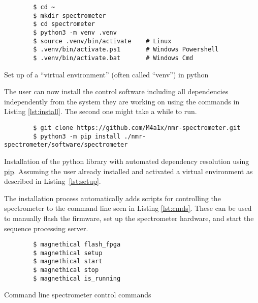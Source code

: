 \begin{listing}[h!bt]
    \begin{verbatim}
        $ cd ~
        $ mkdir spectrometer
        $ cd spectrometer
        $ python3 -m venv .venv
        $ source .venv/bin/activate    # Linux
        $ .venv/bin/activate.ps1       # Windows Powershell
        $ .venv/bin/activate.bat       # Windows Cmd
    \end{verbatim}
    \caption{Set up of a \enquote{virtual environment} (often called \enquote{venv}) in \gls{python}}
    \label{lst:setup}
\end{listing}

The user can now install the control software including all dependencies independently from the system they are working on using the commands in Listing \ref{lst:install}. The second one might take a while to run.

\begin{listing}[h!bt]
    \begin{verbatim}
        $ git clone https://github.com/M4a1x/nmr-spectrometer.git
        $ python3 -m pip install ./nmr-spectrometer/software/spectrometer
    \end{verbatim}
    \caption{Installation of the python library with automated dependency resolution using \href{https://pypi.org/project/pip/}{\acrshort{pip}}. Assuming the user already installed and activated a virtual environment as described in Listing~\ref{lst:setup}.}
    \label{lst:install}
\end{listing}

The installation process automatically adds scripts for controlling the spectrometer to the command line seen in Listing \ref{lst:cmds}. These can be used to manually flash the firmware, set up the spectrometer hardware, and start the sequence processing server.

\begin{listing}[h!bt]
    \begin{verbatim}
        $ magnethical flash_fpga
        $ magnethical setup
        $ magnethical start
        $ magnethical stop
        $ magnethical is_running
    \end{verbatim}
    \caption{Command line spectrometer control commands}
    \label{lst:cmds}
\end{listing}

